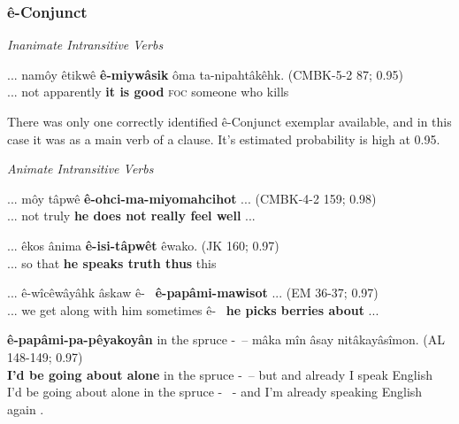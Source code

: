     \subsubsection{ê-Conjunct}
    \textit{Inanimate Intransitive Verbs}
    
    \begin{exe}
    \ex
    \gll ... namôy êtikwê \textbf{ê-miywâsik} ôma ta-nipahtâkêhk. \tiny{(CMBK-5-2 87; 0.95)} \\
         ...  not apparently {\textbf{it is good}} \textsc{foc} {someone who kills}\\
    \trans  
    \label{ii-cnjtype}
    \end{exe}
    
    There was only one correctly identified ê-Conjunct exemplar available, and in this case it was as a main verb of a clause. It's estimated probability is high at 0.95.
    
    \vspace{5mm}
    \textit{Animate Intransitive Verbs}
    
    \begin{exe}
    \ex
    \gll ... môy tâpwê \textbf{ê-ohci-ma-miyomahcihot} ... \tiny{(CMBK-4-2 159; 0.98)} \\
         ... not truly {\textbf{he does not really feel well}} ...\\
    \trans  
    \label{ai-cnjtype1}
    \end{exe}
    
    \begin{exe}
    \ex
    \gll ... êkos ânima \textbf{ê-isi-tâpwêt} êwako. \tiny{(JK 160; 0.97)} \\
         ... so that {\textbf{he speaks truth thus}} this \\
    \trans  
    \label{ai-cnjtype2}
    \end{exe}
    

    \begin{exe}
    \ex
    \gll ... ê-wîcêwâyâhk âskaw ê-~ \textbf{ê-papâmi-mawisot} ... \tiny{(EM 36-37; 0.97)} \\
         ... {we get along with him} sometimes ê-~ \textbf{he picks berries about} ...\\
    \trans  
    \label{ai-cnjtype3}
    \end{exe}
    
    \begin{exe}
    \ex
    \gll \textbf{ê-papâmi-pa-pêyakoyân} in the spruce -~–	mâka mîn âsay nitâkayâsîmon. \tiny{(AL 148-149; 0.97)} \\
    {\textbf{I'd be going about alone}} in the spruce -~– but and already {I speak English}  \\
    \trans  I'd be going about alone in the spruce -~ - and I'm already speaking English again \tiny{\citep[254-255]{Bearetal1992}}.

    \label{ai-cnjtype4}
    \end{exe}
    
